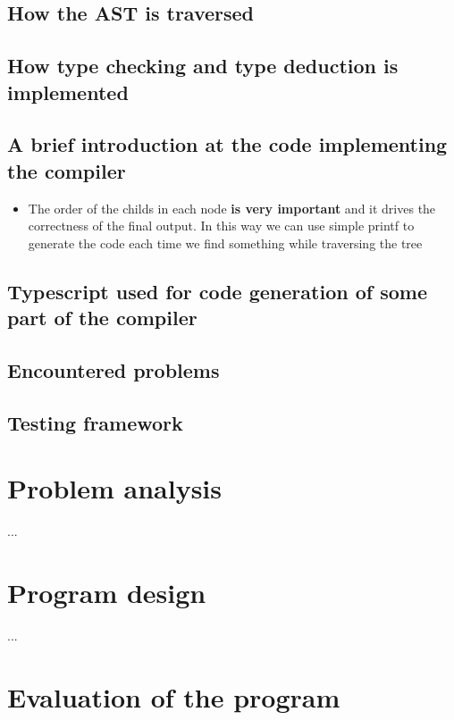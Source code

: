 \documentclass[a4paper]{article}
\begin{document}
\subsection{How the AST is traversed}

\subsection{How type checking and type deduction is implemented}

\subsection{A brief introduction at the code implementing the compiler}

\begin{itemize}
    \item The order of the childs in each node \textbf{is very important} and it drives
        the correctness of the final output. In this way we can use simple printf to generate
        the code each time we find something while traversing the tree
\end{itemize}

\subsection{Typescript used for code generation of some part of the compiler}

\subsection{Encountered problems}

\subsection{Testing framework}


\section{Problem analysis}

...

\section{Program design}

...

\section{Evaluation of the program}
\end{document}
